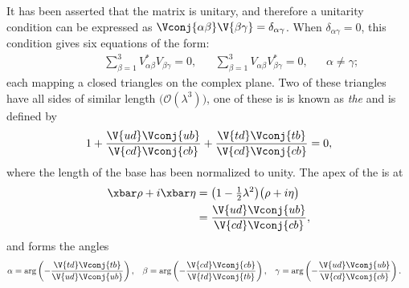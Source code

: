It has been asserted that the \ckm matrix is unitary, and therefore a
unitarity condition can be expressed as
$\Vconj{\alpha\beta}\V{\beta\gamma}=\delta_{\alpha\gamma}$.
When $\delta_{\alpha\gamma}=0$, this condition gives six equations of the form:
\begin{align}
  \phantom{\beta\neq\gamma}
  &&\sum_{\beta=1}^3V_{\alpha\beta}^*V_{\beta\gamma}^{\phantom{*}} = 0,
  &&\sum_{\beta=1}^3V_{\alpha\beta}^{\phantom{*}}V_{\beta\gamma}^*=0,
  &&\alpha\neq\gamma;
  \label{eq:th:offdiag}
\end{align}
each mapping a closed triangles on the complex plane.
Two of these triangles have all sides of similar length
$\big(\mathcal{O}(\lambda^3)\big)$,
one of these is
is known as \emph{the} \ut and is defined by
\begin{equation}
  1 + \frac{\V{ud}\Vconj{ub}}{\V{cd}\Vconj{cb}} + \frac{\V{td}\Vconj{tb}}{\V{cd}\Vconj{cb}} = 0,
  \label{eq:th:ut}
\end{equation}
where the length of the base has been normalized to unity.
The apex of the \ut is at
\begin{align}
  \xbar\rho+i\xbar\eta &= \big(1-\tfrac12\lambda^2\big)\big(\rho+i\eta\big)
  \nonumber\\
  &=\frac{\V{ud}\Vconj{ub}}{\V{cd}\Vconj{cb}},
\end{align}
and forms the angles
\begin{align}
  \alpha &= \arg\left(-\frac{\V{td}\Vconj{tb}}{\V{ud}\Vconj{ub}}\right), &
  \beta  &= \arg\left(-\frac{\V{cd}\Vconj{cb}}{\V{td}\Vconj{tb}}\right), &
  \gamma &= \arg\left(-\frac{\V{ud}\Vconj{ub}}{\V{cd}\Vconj{cb}}\right).
  \label{eq:ut:angles}
\end{align}
